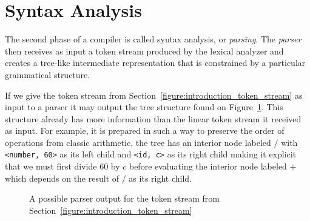 \documentclass[
    oneside,
    english,
    embeddedlogo,
    noabntexcite
]{ufsc-thesis-rn46-2019}
\begin{document}
\section{Syntax Analysis}

The second phase of a compiler is called syntax analysis, or \textit{parsing}.
The \textit{parser} then receives as input a token stream produced by the lexical analyzer and creates a tree-like intermediate representation that is constrained by a particular grammatical structure.


If we give the token stream from Section~\ref{figure:introduction_token_stream} as input to a parser it may output the tree structure found on Figure~\ref{figure:introduction_ast}.
This structure already has more information than the linear token stream it received as input.
For example, it is prepared in such a way to preserve the order of operations from classic arithmetic, the tree has an interior node labeled $/$ with \verb+<number, 60>+ as its left child and \verb+<id, c>+ as its right child making it explicit that we must first divide $60$ by $c$ before evaluating the interior node labeled $+$ which depends on the result of $/$ as its right child.

\begin{figure}
    \caption{A possible parser output for the token stream from Section~\ref{figure:introduction_token_stream}}\label{figure:introduction_ast}
    \centering
\end{figure}
\end{document}
